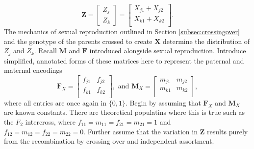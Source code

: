 \documentclass{article}
\newcommand{\ve}[1]{\mathbf{#1}}           %
\newcommand{\m}[1]{\mathbf{#1}}               %
\begin{document}
$$\ve{Z} = \begin{bmatrix} Z_j \\ Z_k \end{bmatrix} = \begin{bmatrix}
  X_{j1} + X_{j2} \\
  X_{k1} + X_{k2} \\
\end{bmatrix}.$$
The mechanics of sexual reproduction outlined in Section \ref{subsec:crossingover} and the genotype of the parents crossed to create $\m{X}$ determine the distribution of $Z_j$ and $Z_k$. Recall $\m{M}$ and $\m{F}$ introduced alongside sexual reproduction. Introduce simplified, annotated forms of these matrices here to represent the paternal and maternal encodings
$$\m{F}_X = \begin{bmatrix}
  f_{j1} & f_{j2} \\
  f_{k1} & f_{k2} \\
\end{bmatrix}, \text{ and }
\m{M}_X = \begin{bmatrix}
  m_{j1} & m_{j2} \\
  m_{k1} & m_{k2} \\
\end{bmatrix},$$
where all entries are once again in $\{0,1\}$. Begin by assuming that $\m{F}_X$ and $\m{M}_X$ are known constants. There are theoretical populatins where this is true such as the $F_2$ intercross, where $f_{11} = m_{11} = f_{21} = m_{21} = 1$ and $f_{12} = m_{12} = f_{22} = m_{22} = 0$. Further assume that the variation in $\ve{Z}$ results purely from the recombination by crossing over and independent assortment.
\end{document}
